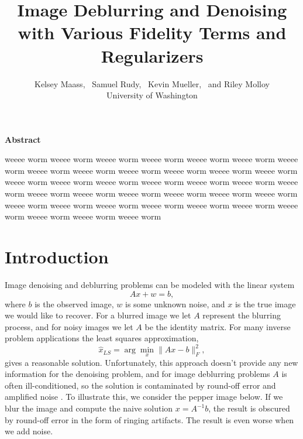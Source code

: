 \documentclass[10pt,a4paper]{article}
\begin{document}
\title{Image Deblurring and Denoising \\with Various Fidelity Terms and Regularizers}
\author{
Kelsey Maass, ~Samuel Rudy, ~Kevin Mueller, ~and Riley Molloy\\
University of Washington\\
}

\maketitle

\begin{center}
\begin{minipage}{0.8\textwidth}
\begin{center}
\textbf{Abstract}
\end{center}
weeee worm weeee worm weeee worm weeee worm weeee worm weeee worm weeee worm weeee worm weeee worm weeee worm weeee worm weeee worm weeee worm weeee worm weeee worm weeee worm weeee worm weeee worm weeee worm weeee worm weeee worm weeee worm weeee worm weeee worm weeee worm weeee worm weeee worm weeee worm weeee worm weeee worm weeee worm weeee worm weeee worm weeee worm weeee worm weeee worm 
\end{minipage}
\end{center}

\section{Introduction}
Image denoising and deblurring problems can be modeled with the linear system
\begin{equation}
Ax + w = b,
\end{equation}
where $b$ is the observed image, $w$ is some unknown noise, and $x$ is the true image we would like to recover. For a blurred image we let $A$ represent the blurring process, and for noisy images we let $A$ be the identity matrix. For many inverse problem applications the least squares approximation, 
\begin{equation}
\hat{x}_{LS} = \arg\min_x \| Ax - b \|_F^2 ,
\end{equation}
gives a reasonable solution. Unfortunately, this approach doesn't provide any new information for the denoising problem, and for image deblurring problems $A$ is often ill-conditioned, so the solution is contaminated by round-off error and amplified noise \cite{DeblurBook}. To illustrate this, we consider the pepper image below. If we blur the image and compute the naive solution $x = A^{-1}b$, the result is obscured by round-off error in the form of ringing artifacts. The result is even worse when we add noise.
\end{document}
